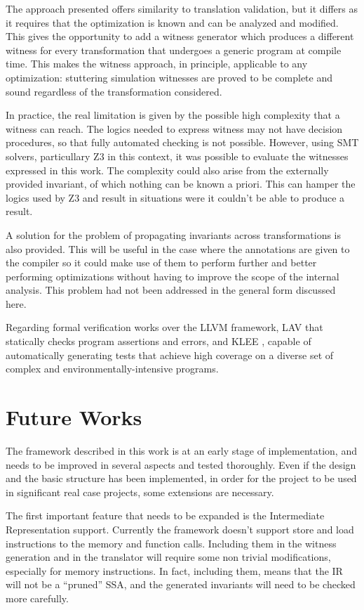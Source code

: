 The approach presented offers similarity to translation validation, but it differs as it requires that the optimization is known and can be analyzed and modified. This gives the opportunity to add a witness generator which produces a different witness for every transformation that undergoes a generic program at compile time. This makes the witness approach, in principle, applicable to any optimization: stuttering simulation witnesses are proved to be complete and sound regardless of the transformation considered.

In practice, the real limitation is given by the possible high complexity that a witness can reach. The logics needed to express witness may not have decision procedures, so that fully automated checking is not possible. However, using SMT solvers, particullary Z3 in this context, it was possible to evaluate the witnesses expressed in this work. The complexity could also arise from the externally provided invariant, of which nothing can be known a priori. This can hamper the logics used by Z3 and result in situations were it couldn't be able to produce a result.

A solution for the problem of propagating invariants across transformations is also provided. This will be useful in the case where the annotations are given to the compiler so it could make use of them to perform further and better performing optimizations without having to improve the scope of the internal analysis. This problem had not been addressed in the general form discussed here.

Regarding formal verification works over the LLVM framework, LAV \cite{vujovsevic2012development} that statically checks program assertions and errors, and KLEE \cite{cadar2008klee}, capable of automatically generating tests that achieve high coverage on a diverse set of complex and environmentally-intensive programs.

\section{Future Works}
\label{sec:future_works}
The framework described in this work is at an early stage of implementation, and needs to be improved in several aspects and tested thoroughly. Even if the design and the basic structure has been implemented, in order for the project to be used in significant real case projects, some extensions are necessary.

The first important feature that needs to be expanded is the Intermediate Representation support. Currently the framework doesn't support store and load instructions to the memory and function calls. Including them in the witness generation and in the translator will require some non trivial modifications, especially for memory instructions. In fact, including them, means that the IR will not be a ``pruned'' SSA, and the generated invariants will need to be checked more carefully.

